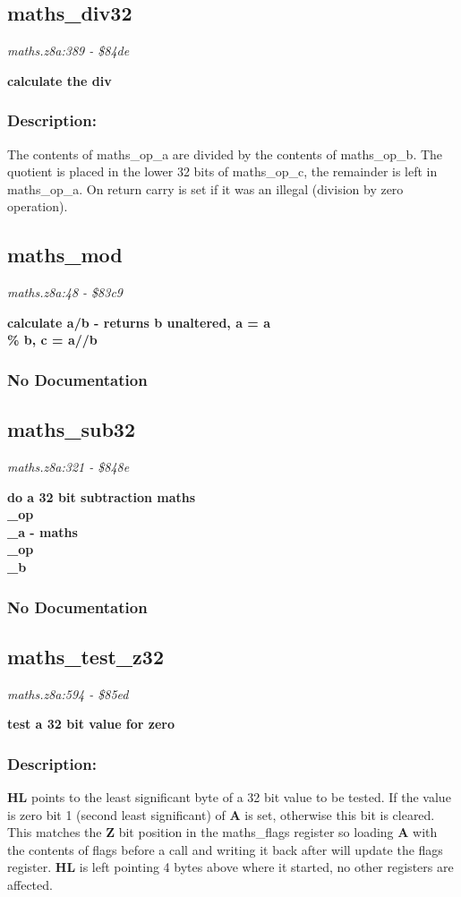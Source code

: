 \subsection{maths\_div32}
\textit{maths.z8a:389 - \$84de}

\noindent
\textbf{calculate the div}

\subsubsection{Description:}
 The contents of maths\_op\_a are divided by the contents of maths\_op\_b.  The quotient is placed in the lower 32 bits of maths\_op\_c, the remainder is left in maths\_op\_a.  On return carry is set if it was an illegal (division by zero operation).

\subsection{maths\_mod}
\textit{maths.z8a:48 - \$83c9}

\noindent
\textbf{calculate a/b - returns b unaltered, a = a \\\% b, c = a//b}

\subsubsection{No Documentation}


\subsection{maths\_sub32}
\textit{maths.z8a:321 - \$848e}

\noindent
\textbf{do a 32 bit subtraction maths\\\_op\\\_a - maths\\\_op\\\_b}

\subsubsection{No Documentation}


\subsection{maths\_test\_z32}
\textit{maths.z8a:594 - \$85ed}

\noindent
\textbf{test a 32 bit value for zero}

\subsubsection{Description:}
 \textbf{HL} points to the least significant byte of a 32 bit value to be tested.  If the value is zero bit 1 (second least significant) of \textbf{A} is set, otherwise this bit is cleared.  This matches the \textbf{Z} bit position in the maths\_flags  register so loading \textbf{A} with the contents of flags before a call and writing it back after will update the flags register.  \textbf{HL} is left pointing 4 bytes above where it started, no other registers are affected.

